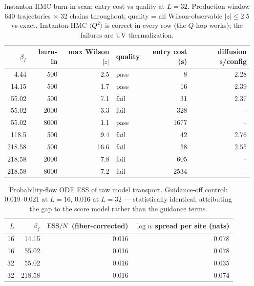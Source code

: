 \begin{table}[p]
  \centering
  \caption{Instanton-HMC burn-in scan: entry cost vs quality at $L = 32$.
  Production window 640 trajectories $\times$ 32 chains throughout;
  quality = all Wilson-observable $|z| \le 2.5$ vs exact. Instanton-HMC
  $\langle Q^2 \rangle$ is correct in every row (the $Q$-hop works); the
  failures are UV thermalization.}
  \label{tab:burnin-scan}
  \begin{tabular}{rrrlrr}
    \toprule
    $\beta_f$ & burn-in & max Wilson $|z|$ & quality & entry cost (s) &
    diffusion s/config \\
    \midrule
    4.44   & 500  & 2.5  & pass & 8    & 2.28 \\
    14.15  & 500  & 1.7  & pass & 16   & 2.39 \\
    55.02  & 500  & 7.1  & fail & 31   & 2.37 \\
    55.02  & 2000 & 3.3  & fail & 328  & --   \\
    55.02  & 8000 & 1.1  & pass & 1677 & --   \\
    118.5  & 500  & 9.4  & fail & 42   & 2.76 \\
    218.58 & 500  & 16.6 & fail & 58   & 2.55 \\
    218.58 & 2000 & 7.8  & fail & 605  & --   \\
    218.58 & 8000 & 7.2  & fail & 2534 & --   \\
    \bottomrule
  \end{tabular}
\end{table}

\begin{table}[p]
  \centering
  \caption{Probability-flow ODE ESS of raw model transport. Guidance-off
  control: 0.019--0.021 at $L = 16$, 0.016 at $L = 32$ --- statistically
  identical, attributing the gap to the score model rather than the
  guidance terms.}
  \label{tab:ode-ess}
  \begin{tabular}{rrrr}
    \toprule
    $L$ & $\beta_f$ & ${\rm ESS}/N$ (fiber-corrected) &
    $\log w$ spread per site (nats) \\
    \midrule
    16 & 14.15  & 0.016 & 0.078 \\
    16 & 55.02  & 0.016 & 0.078 \\
    32 & 55.02  & 0.016 & 0.035 \\
    32 & 218.58 & 0.016 & 0.074 \\
    \bottomrule
  \end{tabular}
\end{table}
